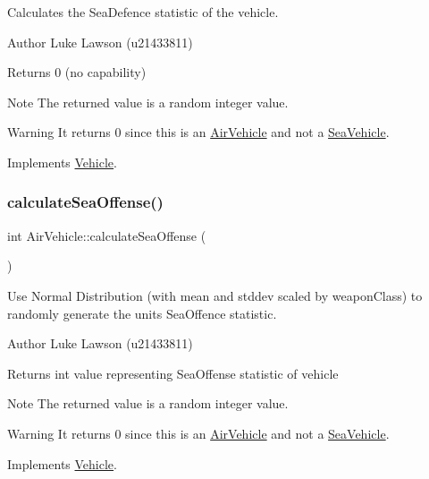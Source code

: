 Calculates the Sea\+Defence statistic of the vehicle. 

\begin{DoxyAuthor}{Author}
Luke Lawson (u21433811) 
\end{DoxyAuthor}
\begin{DoxyReturn}{Returns}
0 (no capability) 
\end{DoxyReturn}
\begin{DoxyNote}{Note}
The returned value is a random integer value. 
\end{DoxyNote}
\begin{DoxyWarning}{Warning}
It returns 0 since this is an \mbox{\hyperlink{class_air_vehicle}{Air\+Vehicle}} and not a \mbox{\hyperlink{class_sea_vehicle}{Sea\+Vehicle}}. 
\end{DoxyWarning}


Implements \mbox{\hyperlink{class_vehicle_a20e871b1ff13d47f4c875c987ed68add}{Vehicle}}.

\mbox{\label{class_air_vehicle_ad79fc5014baa403de34c435d3c2c14d0}} 
\subsubsection{\texorpdfstring{calculateSeaOffense()}{calculateSeaOffense()}}
{\footnotesize\ttfamily int Air\+Vehicle\+::calculate\+Sea\+Offense (\begin{DoxyParamCaption}{ }\end{DoxyParamCaption})\hspace{0.3cm}{\ttfamily [virtual]}}



Use Normal Distribution (with mean and stddev scaled by weapon\+Class) to randomly generate the unit\textquotesingle{}s Sea\+Offence statistic. 

\begin{DoxyAuthor}{Author}
Luke Lawson (u21433811) 
\end{DoxyAuthor}
\begin{DoxyReturn}{Returns}
int value representing Sea\+Offense statistic of vehicle 
\end{DoxyReturn}
\begin{DoxyNote}{Note}
The returned value is a random integer value. 
\end{DoxyNote}
\begin{DoxyWarning}{Warning}
It returns 0 since this is an \mbox{\hyperlink{class_air_vehicle}{Air\+Vehicle}} and not a \mbox{\hyperlink{class_sea_vehicle}{Sea\+Vehicle}}. 
\end{DoxyWarning}


Implements \mbox{\hyperlink{class_vehicle_ab70b8c0eef30b37648a1ab9903043f47}{Vehicle}}.

